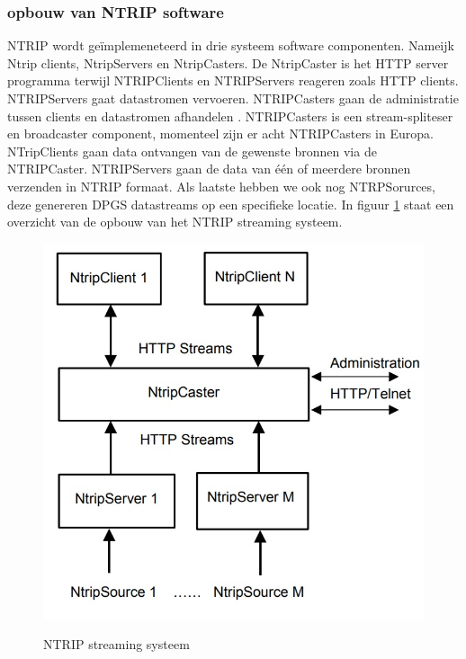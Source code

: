 \subsubsection{opbouw van NTRIP software}
\label{LONS}
NTRIP wordt ge\"implemeneteerd in drie systeem software componenten. Nameijk Ntrip clients, NtripServers en NtripCasters. De NtripCaster is het HTTP server programma terwijl NTRIPClients en NTRIPServers reageren zoals HTTP clients\cite{LBibNTRIP}. NTRIPServers gaat datastromen vervoeren. NTRIPCasters gaan de administratie tussen clients en datastromen afhandelen \cite{LBibGPS}. NTRIPCasters is een stream-spliteser en broadcaster component, momenteel zijn er acht NTRIPCasters in Europa. NTripClients gaan data ontvangen van de gewenste bronnen via de NTRIPCaster. NTRIPServers gaan de data van \'e\'en of meerdere bronnen verzenden in NTRIP formaat. Als laatste hebben we ook nog NTRPSorurces, deze genereren DPGS datastreams op een specifieke locatie. \cite{LBibNTRIP} In figuur \ref{imgNTRIP} staat een overzicht van de opbouw van het NTRIP streaming systeem.

\begin{figure}[hpb]
	\includegraphics[scale=0.75]{NTRIP.jpg}
	\caption{NTRIP streaming systeem}
	\cite{LBibNTRIP}
	\label{imgNTRIP}
\end{figure} 
 



